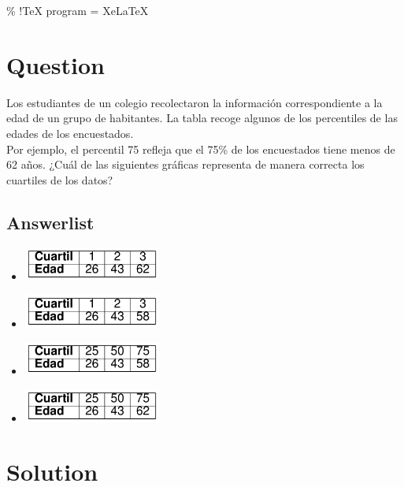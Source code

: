 \documentclass[
]{article}
\author{}
\date{\vspace{-2.5em}}
\begin{document}
\% !TeX program = XeLaTeX

\hypertarget{question}{%
\section{Question}\label{question}}

Los estudiantes de un colegio recolectaron la información
correspondiente a la edad de un grupo de habitantes. La tabla recoge
algunos de los percentiles de las edades de los encuestados.\\

Por ejemplo, el percentil 75 refleja que el 75\% de los encuestados
tiene menos de 62 años. ¿Cuál de las siguientes gráficas representa de
manera correcta los cuartiles de los datos?

\hypertarget{answerlist}{%
\subsection{Answerlist}\label{answerlist}}

\begin{itemize}
\item
  \includegraphics[width=4.5cm,height=\textheight]{image01.png}
\item
  \includegraphics[width=4.5cm,height=\textheight]{image02.png}
\item
  \includegraphics[width=4.5cm,height=\textheight]{image03.png}
\item
  \includegraphics[width=4.5cm,height=\textheight]{image04.png}
\end{itemize}

\hypertarget{solution}{%
\section{Solution}\label{solution}}
\end{document}
